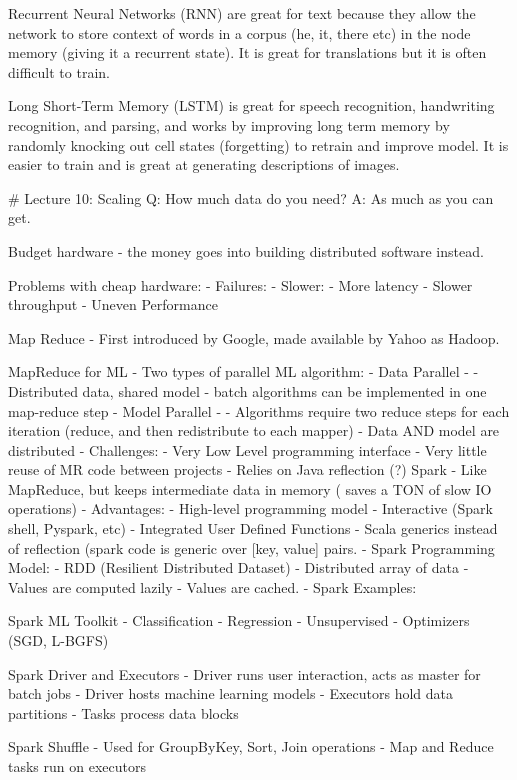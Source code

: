 \documentclass[3pt,landscape]{article}
\begin{document}
\begin{multicols}{3}
Recurrent Neural Networks (RNN) are great for text because they allow the network to store context of words in a corpus (he, it, there etc) in the node memory (giving it a recurrent state). It is great for translations but it is often difficult to train. 

Long Short-Term Memory (LSTM) is great for speech recognition, handwriting recognition, and parsing, and works by improving long term memory by randomly knocking out cell states (forgetting) to retrain and improve model. It is easier to train and is great at generating descriptions of images. 

\# Lecture 10: Scaling
Q: How much data do you need?
A: As much as you can get. 

Budget hardware - the money goes into building distributed software instead. 

Problems with cheap hardware: 
- Failures:
- Slower:
  - More latency
  - Slower throughput
- Uneven Performance

Map Reduce
- First introduced by Google, made available by Yahoo as Hadoop. 

MapReduce for ML
- Two types of parallel ML algorithm:
  - Data Parallel -
    -  Distributed data, shared model
    - batch algorithms can be implemented in one map-reduce step
  - Model Parallel - 
    - Algorithms require two reduce steps for each iteration (reduce, and then redistribute to each mapper)
    - Data AND model are distributed 
- Challenges:
  - Very Low Level programming interface 
  - Very little reuse of MR code between projects
  - Relies on Java reflection (?)
Spark 
- Like MapReduce, but keeps intermediate data in memory ( saves a TON of slow IO operations)
- Advantages:
  - High-level programming model
  - Interactive (Spark shell, Pyspark, etc)
  - Integrated User Defined Functions
  - Scala generics instead of reflection (spark code is generic over [key, value] pairs. 
- Spark Programming Model:
  - RDD (Resilient Distributed Dataset)
    - Distributed array of data
    - Values are computed lazily
    - Values are cached. 
- Spark Examples:

Spark ML Toolkit
- Classification
- Regression
- Unsupervised
- Optimizers (SGD, L-BGFS)

Spark Driver and Executors
- Driver runs user interaction, acts as master for batch jobs
- Driver hosts machine learning models
- Executors hold data partitions
- Tasks process data blocks

Spark Shuffle
- Used for GroupByKey, Sort, Join operations
- Map and Reduce tasks run on executors


\end{multicols}
\end{document}
